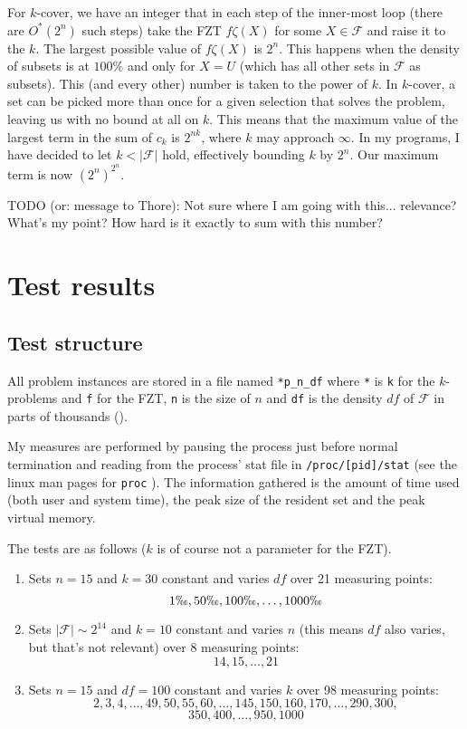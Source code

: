 \documentclass[a4paper, titlepage]{article}
\newcommand{\code}{\texttt}
\begin{document}
For $k$-cover, we have an integer that in each step of the inner-most loop (there are $O^*(2^n)$ such steps) take the FZT $f\zeta(X)$ for some $ X \in \mathcal{F}$ and raise it to the $k$. The largest possible value of $f\zeta(X)$ is $2^n$. This happens when the density of subsets is at $100\%$ and only for $X=U$ (which has all other sets in $\mathcal{F}$ as subsets). This (and every other) number is taken to the power of $k$. In $k$-cover, a set can be picked more than once for a given selection that solves the problem, leaving us with no bound at all on $k$. This means that the maximum value of the largest term in the sum of $c_k$ is $2^{nk}$, where $k$ may approach $\infty$. In my programs, I have decided to let $k < |\mathcal{F}|$ hold, effectively bounding $k$ by $2^n$. Our maximum term is now $(2^n)^{2^n}$. 

TODO (or: message to Thore): Not sure where I am going with this... relevance? What's my point? How hard is it exactly to sum with this number? 

\section{Test results}

\subsection{Test structure}
All problem instances are stored in a file named \code{*p\_n\_df} where \code{*} is \code{k} for the $k$-problems and \code{f} for the FZT, \code{n} is the size of $n$ and \code{df} is the density $df$ of $\mathcal{F}$ in parts of thousands (\permil).

My measures are performed by pausing the process just before normal termination and reading from the process' stat file in \code{/proc/[pid]/stat} (see the linux man pages for \code{proc} \cite{proc}). The information gathered is the amount of time used (both user and system time), the peak size of the resident set and the peak virtual memory.

The tests are as follows ($k$ is of course not a parameter for the FZT).

\begin{enumerate}
 \item Sets $n = 15$ and $k = 30$ constant and varies $df$ over 21 measuring points: $$1\permil, 50\permil, 100\permil, \ldots, 1000\permil$$
 \item Sets $|\mathcal{F}| \sim 2^{14}$ and $k = 10$ constant and varies $n$ (this means $df$ also varies, but that's not relevant) over 8 measuring points: $$14, 15, \ldots, 21$$
 \item Sets $n = 15$ and $df = 100$ constant and varies $k$ over 98 measuring points: $$2, 3, 4, \ldots, 49, 50, 55, 60, \ldots, 145, 150, 160, 170, \ldots, 290, 300, $$ $$350, 400, \ldots, 950, 1000 $$

\end{enumerate}
\end{document}
